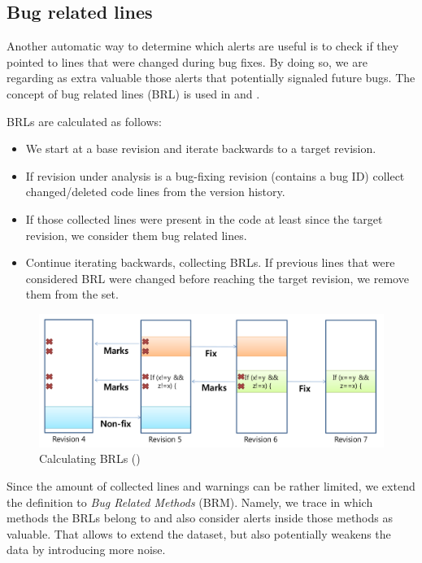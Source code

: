 \subsection{Bug related lines}

Another automatic way to determine which alerts are useful is to check if they pointed to lines that were changed during bug fixes. By doing so, we are regarding as extra valuable those alerts that potentially signaled future bugs. The concept of bug related lines (BRL) is used in \cite{which_warnings} and \cite{automatic_training_set}.

BRLs are calculated as follows:
\begin{itemize}
    \item We start at a base revision and iterate backwards to a target revision. 
    \item If revision under analysis is a bug-fixing revision (contains a bug ID) collect changed/deleted code lines from the version history.
    \item If those collected lines were present in the code at least since the target revision, we consider them bug related lines.
    \item Continue iterating backwards, collecting BRLs. If previous lines that were considered BRL were changed before reaching the target revision, we remove them from the set. 
\end{itemize}

\begin{figure}[H]
    \centering
    \includegraphics[scale=0.3]{./src/brl_example.png}
    \caption{Calculating BRLs (\cite{which_warnings})}
\end{figure}


Since the amount of collected lines and warnings can be rather limited, we extend the definition to \textit{Bug Related Methods} (BRM). Namely, we trace in which methods the BRLs belong to and also consider alerts inside those methods as valuable. That allows to extend the dataset, but also potentially weakens the data by introducing more noise.

